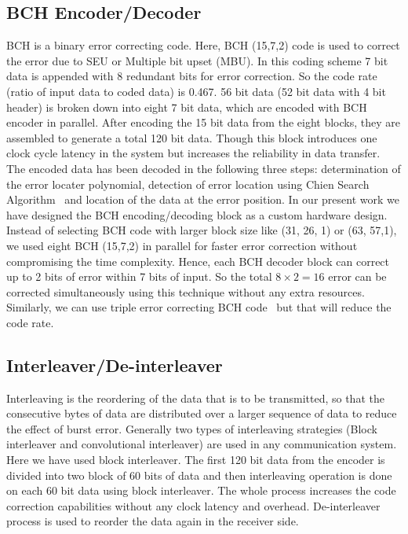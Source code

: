 \documentclass[10pt, conference, compsocconf]{IEEEtran}
\begin{document}
\subsection{BCH Encoder/Decoder} BCH is a binary error correcting code. Here, BCH (15,7,2) code is used to correct the error due to SEU or Multiple bit upset (MBU). In this coding scheme 7 bit data is appended with 8 redundant bits for error correction. So the code rate (ratio of input data to coded data) is 0.467. 56 bit data (52 bit data with 4 bit header) is broken down into eight 7 bit data, which are encoded with BCH encoder in parallel. After encoding the 15 bit data from the eight blocks, they are assembled to generate a total 120 bit data. Though this block introduces one clock cycle latency in the system but increases the reliability in data transfer. The encoded data has been decoded in the following three steps: determination of the error locater polynomial, detection of error location using Chien Search Algorithm~\cite{chien:search} and location of the data at the error position\iffalse One can find the details of BCH algorithm in~\cite{bch:book} \fi. In our present work we have designed the BCH encoding/decoding block as a custom hardware design. Instead of selecting BCH code with larger block size like (31, 26, 1) or (63, 57,1), we used eight BCH (15,7,2) in parallel for faster error correction without compromising the time complexity. Hence, each BCH decoder block can correct up to 2 bits of error within 7 bits of input. So the total  $8\times 2 = 16$  error can be corrected simultaneously using this technique without any extra resources. Similarly, we can use triple error correcting BCH code~\cite{chien:search} but that will reduce the code rate.
\subsection{Interleaver/De-interleaver} Interleaving is the reordering of the data that is to be transmitted, so that the consecutive bytes of data are distributed over a larger sequence of data to reduce the effect of burst error. Generally two types of interleaving strategies  (Block interleaver and convolutional interleaver) are used in any communication system. Here we have used block interleaver. The first 120 bit data from the encoder is divided into two block of 60 bits of data and then interleaving operation is done on each 60 bit data using block interleaver. The whole process increases the code correction capabilities without any clock latency and overhead. De-interleaver process is used to reorder the data again in the receiver side.
\end{document}
